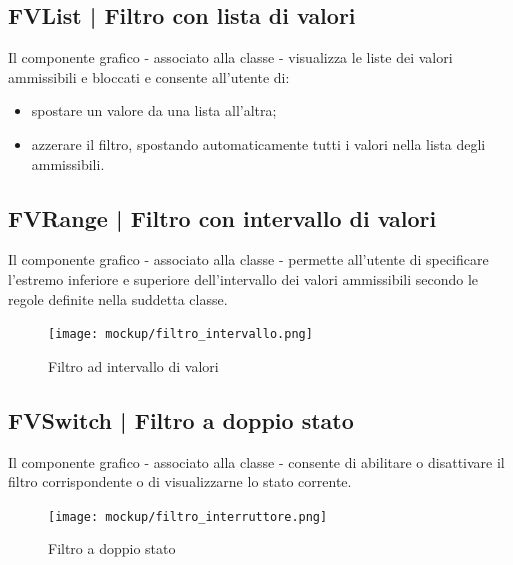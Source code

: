 \documentclass[10pt,a4paper,headinclude,footinclude,hidelinks]{scrreprt} %
\begin{document}
	\subsection[FVList]{FVList | Filtro con lista di valori}
	\label{sec:stage:design:view.filter:list-filter}
	Il componente grafico - associato alla classe \textit{} - visualizza le liste dei valori ammissibili e bloccati e consente all'utente di:
	\begin{itemize}
	\item spostare un valore da una lista all'altra;
	\item azzerare il filtro, spostando automaticamente tutti i valori nella lista degli ammissibili.
	\end{itemize}

	\subsection[FVRange]{FVRange | Filtro con intervallo di valori}
	\label{sec:stage:design:view.filter:range-filter}
	Il componente grafico - associato alla classe \textit{} - permette all'utente di specificare l'estremo inferiore e superiore dell'intervallo dei valori ammissibili secondo le regole definite nella suddetta classe.

	\begin{figure}[ht]
		\begin{center}
	    	\texttt{[image: mockup/filtro\_intervallo.png]}
			\label{gfx:mockup:filter:range}
			\caption{Filtro ad intervallo di valori}
		\end{center}
	\end{figure}

	\subsection[FVSwitch]{FVSwitch | Filtro a doppio stato}
	\label{sec:stage:design:view.filter:switch-filter}
	Il componente grafico - associato alla classe \textit{} - consente di abilitare o disattivare il filtro corrispondente o di visualizzarne lo stato corrente.

	\begin{figure}[ht]
		\begin{center}
	    	\texttt{[image: mockup/filtro\_interruttore.png]}
			\label{gfx:mockup:filter:switch}
			\caption{Filtro a doppio stato}
		\end{center}
	\end{figure}
\end{document}
